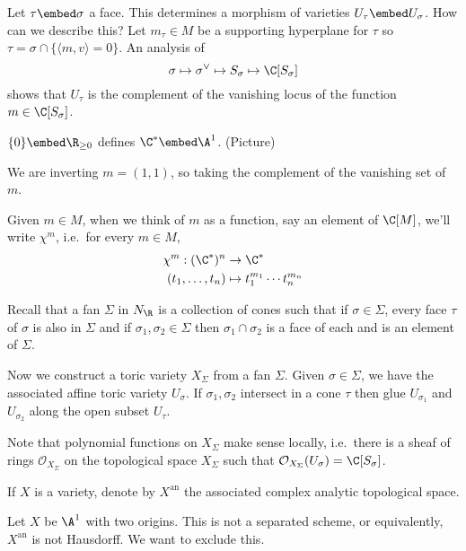 \documentclass[a4paper]{article}
\begin{document}
Let \(\tau \embed \sigma\) a face. This determines a morphism of varieties \(U_\tau \embed U_\sigma\). How can we describe this? Let \(m_\tau \in M\) be a supporting hyperplane for \(\tau\) so \(\tau = \sigma \cap \{\langle m, v\rangle = 0\}\). An analysis of
\[
  \sigma \mapsto \sigma^\vee \mapsto S_\sigma \mapsto \C[S_\sigma]
\]
shows that \(U_\tau\) is the complement of the vanishing locus of the function \(m \in \C[S_\sigma]\).

\begin{eg}
  \(\{0\} \embed \R_{\geq 0}\) defines \(\C^* \embed \A^1\).
  (Picture)

  We are inverting \(m = (1, 1)\), so taking the complement of the vanishing set of \(m\).
\end{eg}

\begin{notation}
  Given \(m \in M\), when we think of \(m\) as a function, say an element of \(\C[M]\), we'll write \(\chi^m\), i.e.\ for every \(m \in M\),
  \begin{align*}
    \chi^m: (\C^*)^n &\to \C^* \\
    (t_1, \dots, t_n) &\mapsto t_1^{m_1} \cdots t_n^{m_n}
  \end{align*}
\end{notation}

Recall that a fan \(\Sigma\) in \(N_\R\) is a collection of cones such that if \(\sigma \in \Sigma\), every face \(\tau\) of \(\sigma\) is also in \(\Sigma\) and if \(\sigma_1, \sigma_2 \in \Sigma\) then \(\sigma_1 \cap \sigma_2\) is a face of each and is an element of \(\Sigma\).

Now we construct a toric variety \(X_\Sigma\) from a fan \(\Sigma\). Given \(\sigma \in \Sigma\), we have the associated affine toric variety \(U_\sigma\). If \(\sigma_1, \sigma_2\) intersect in a cone \(\tau\) then glue \(U_{\sigma_1}\) and \(U_{\sigma_2}\) along the open subset \(U_\tau\).

Note that polynomial functions on \(X_\Sigma\) make sense locally, i.e.\ there is a sheaf of rings \(\mathcal O_{X_\Sigma}\) on the topological space \(X_\Sigma \) such that \(\mathcal O_{X_\Sigma}(U_\sigma) = \C[S_\sigma]\).

\begin{notation}
  If \(X\) is a variety, denote by \(X^{\text{an}}\) the associated complex analytic topological space.
\end{notation}

\begin{notation}
  Let \(X\) be \(\A^1\) with two origins. This is not a separated scheme, or equivalently, \(X^{\text{an}}\) is not Hausdorff. We want to exclude this.
\end{notation}
\end{document}
